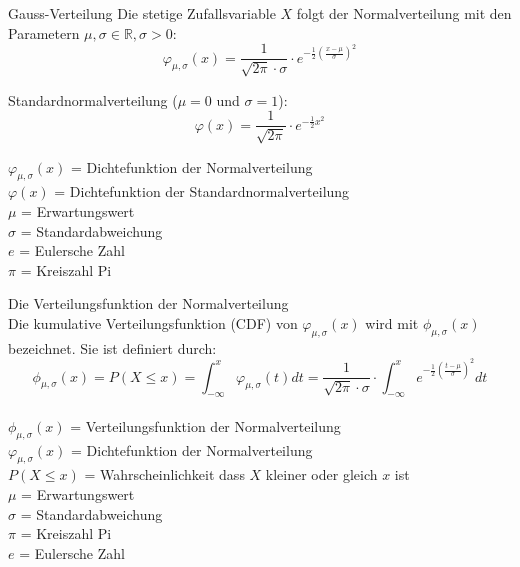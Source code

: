 \begin{definition}{Gauss-Verteilung}
Die stetige Zufallsvariable $X$ folgt der Normalverteilung mit den Parametern $\mu, \sigma \in \mathbb{R}, \sigma>0$:
$$
\varphi_{\mu,\sigma}(x)=\frac{1}{\sqrt{2\pi} \cdot \sigma} \cdot e^{-\frac{1}{2}(\frac{x-\mu}{\sigma})^2}
$$

Standardnormalverteilung ($\mu=0$ und $\sigma=1$):
$$
\varphi(x)=\frac{1}{\sqrt{2\pi}} \cdot e^{-\frac{1}{2}x^2}
$$

$\varphi_{\mu,\sigma}(x)$ = Dichtefunktion der Normalverteilung\\
$\varphi(x)$ = Dichtefunktion der Standardnormalverteilung\\

$\mu$ = Erwartungswert\\
$\sigma$ = Standardabweichung\\
$e$ = Eulersche Zahl\\
$\pi$ = Kreiszahl Pi\\
\end{definition}
\begin{definition}{Die Verteilungsfunktion der Normalverteilung}\\
Die kumulative Verteilungsfunktion (CDF) von $\varphi_{\mu,\sigma}(x)$ wird mit $\phi_{\mu,\sigma}(x)$ bezeichnet. Sie ist definiert durch:
$$
\phi_{\mu,\sigma}(x) = P(X \leq x) = \int_{-\infty}^x \varphi_{\mu,\sigma}(t)dt = \frac{1}{\sqrt{2\pi} \cdot \sigma} \cdot \int_{-\infty}^x e^{-\frac{1}{2}(\frac{t-\mu}{\sigma})^2} dt
$$
\\
$\phi_{\mu,\sigma}(x)$ = Verteilungsfunktion der Normalverteilung\\
$\varphi_{\mu,\sigma}(x)$ = Dichtefunktion der Normalverteilung\\
$P(X \leq x)$ = Wahrscheinlichkeit dass $X$ kleiner oder gleich $x$ ist\\
$\mu$ = Erwartungswert\\
$\sigma$ = Standardabweichung\\
$\pi$ = Kreiszahl Pi\\
$e$ = Eulersche Zahl\\
\end{definition}


